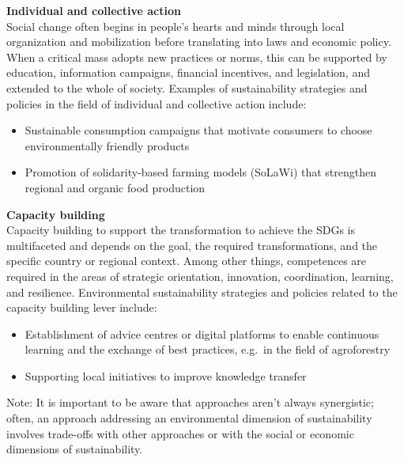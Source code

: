 \documentclass[
  a4paper,
  openany]{book}
\begin{document}
\textbf{Individual and collective action}\\
Social change often begins in people's hearts and minds through local
organization and mobilization before translating into laws and economic
policy. When a critical mass adopts new practices or norms, this can be
supported by education, information campaigns, financial incentives, and
legislation, and extended to the whole of society. Examples of
sustainability strategies and policies in the field of individual and
collective action include:

\begin{itemize}
\item
  Sustainable consumption campaigns that motivate consumers to choose
  environmentally friendly products
\item
  Promotion of solidarity-based farming models (SoLaWi) that strengthen
  regional and organic food production
\end{itemize}

\textbf{Capacity building\\
}Capacity building to support the transformation to achieve the SDGs is
multifaceted and depends on the goal, the required transformations, and
the specific country or regional context. Among other things,
competences are required in the areas of strategic orientation,
innovation, coordination, learning, and resilience. Environmental
sustainability strategies and policies related to the capacity building
lever include:

\begin{itemize}
\item
  Establishment of advice centres or digital platforms to enable
  continuous learning and the exchange of best practices, e.g.~in the
  field of agroforestry
\item
  Supporting local initiatives to improve knowledge transfer\\
\end{itemize}

Note: It is important to be aware that approaches aren't always
synergistic; often, an approach addressing an environmental dimension of
sustainability involves trade-offs with other approaches or with the
social or economic dimensions of sustainability.
\end{document}
